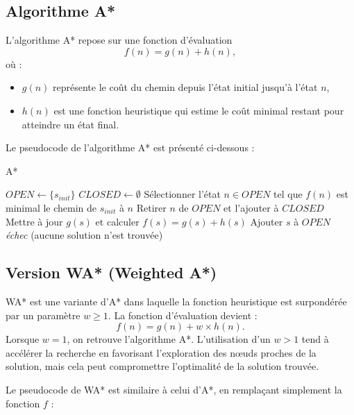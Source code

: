 \subsection{Algorithme A*}

L'algorithme A* repose sur une fonction d'évaluation 
\[
f(n) = g(n) + h(n),
\]
où :
\begin{itemize}
    \item $g(n)$ représente le coût du chemin depuis l'état initial jusqu'à l'état $n$,
    \item $h(n)$ est une fonction heuristique qui estime le coût minimal restant pour atteindre un état final.
\end{itemize}

Le pseudocode de l'algorithme A* est présenté ci-dessous :

\begin{algorithm}[H]
    \caption{A*}
    \begin{algorithmic}[1]
    \State $OPEN \gets \{s_{init}\}$
    \State $CLOSED \gets \emptyset$
        \State Sélectionner l'état $n \in OPEN$ tel que $f(n)$ est minimal
            \State \Return le chemin de $s_{init}$ à $n$
        \EndIf
        \State Retirer $n$ de $OPEN$ et l'ajouter à $CLOSED$
                \State Mettre à jour $g(s)$ et calculer $f(s) = g(s) + h(s)$
                \State Ajouter $s$ à $OPEN$
            \EndIf
        \EndFor
    \EndWhile
    \State \Return \textit{échec} (aucune solution n'est trouvée)
    \end{algorithmic}
\end{algorithm}

\subsection{Version WA* (Weighted A*)}

WA* est une variante d'A* dans laquelle la fonction heuristique est surpondérée par un paramètre $w \geq 1$. La fonction d'évaluation devient :
\[
f(n) = g(n) + w \times h(n).
\]
Lorsque $w = 1$, on retrouve l'algorithme A*. L'utilisation d'un $w>1$ tend à accélérer la recherche en favorisant l'exploration des nœuds proches de la solution, mais cela peut compromettre l'optimalité de la solution trouvée.

Le pseudocode de WA* est similaire à celui d'A*, en remplaçant simplement la fonction $f$ :

